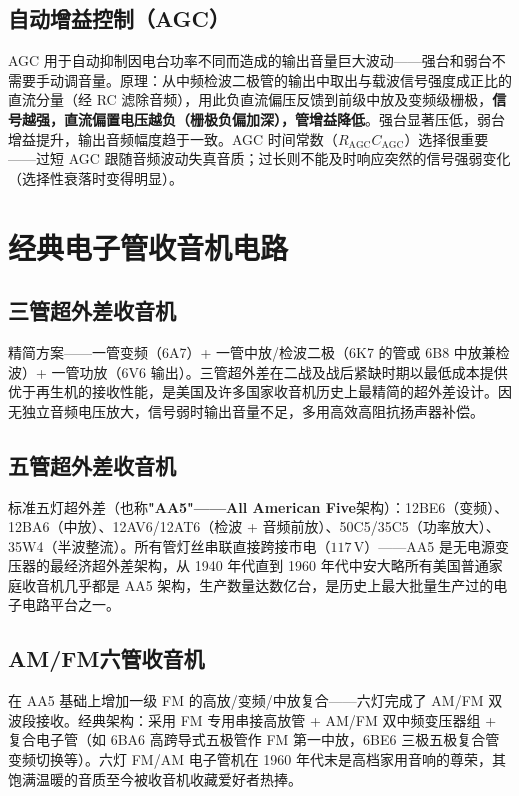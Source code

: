 \documentclass[12pt,UTF8]{ctexbook}
\begin{document}
\subsection{自动增益控制（AGC）}

AGC 用于自动抑制因电台功率不同而造成的输出音量巨大波动——强台和弱台不需要手动调音量。原理：从中频检波二极管的输出中取出与载波信号强度成正比的直流分量（经 RC 滤除音频），用此负直流偏压反馈到前级中放及变频级栅极，\textbf{信号越强，直流偏置电压越负（栅极负偏加深），管增益降低}。强台显著压低，弱台增益提升，输出音频幅度趋于一致。AGC 时间常数（$R_\mathrm{AGC}C_\mathrm{AGC}$）选择很重要——过短 AGC 跟随音频波动失真音质；过长则不能及时响应突然的信号强弱变化（选择性衰落时变得明显）。

\section{经典电子管收音机电路}
\label{sec:classic_tube_circuits}

\subsection{三管超外差收音机}

精简方案——一管变频（6A7）+ 一管中放/检波二极（6K7 的管或 6B8 中放兼检波）+ 一管功放（6V6 输出）。三管超外差在二战及战后紧缺时期以最低成本提供优于再生机的接收性能，是美国及许多国家收音机历史上最精简的超外差设计。因无独立音频电压放大，信号弱时输出音量不足，多用高效高阻抗扬声器补偿。

\subsection{五管超外差收音机}

标准五灯超外差（也称\textbf{"AA5"——All American Five}架构）：12BE6（变频）、12BA6（中放）、12AV6/12AT6（检波 + 音频前放）、50C5/35C5（功率放大）、35W4（半波整流）。所有管灯丝串联直接跨接市电（$117\,\mathrm{V}$）——AA5 是无电源变压器的最经济超外差架构，从 1940 年代直到 1960 年代中安大略所有美国普通家庭收音机几乎都是 AA5 架构，生产数量达数亿台，是历史上最大批量生产过的电子电路平台之一。

\subsection{AM/FM六管收音机}

在 AA5 基础上增加一级 FM 的高放/变频/中放复合——六灯完成了 AM/FM 双波段接收。经典架构：采用 FM 专用串接高放管 + AM/FM 双中频变压器组 + 复合电子管（如 6BA6 高跨导式五极管作 FM 第一中放，6BE6 三极五极复合管变频切换等）。六灯 FM/AM 电子管机在 1960 年代末是高档家用音响的尊荣，其饱满温暖的音质至今被收音机收藏爱好者热捧。
\end{document}
